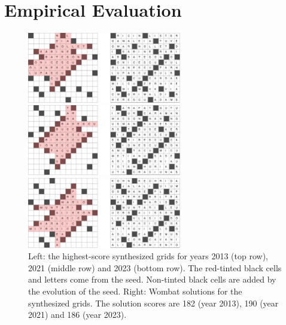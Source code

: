 \section{Empirical Evaluation}


\begin{figure}[h]
\centering
\includegraphics[width=0.6\textwidth]{_empiricalSupport/y-2013/results/_runWombat/mrmeGrids_y2013-60x932-14400x352-14113466-paper.pdf}

\vspace{0.25cm}

\includegraphics[width=0.6\textwidth]{_empiricalSupport/y-2021/results/_runWombat/mrmeGrids_feb3-60x38035-14400x224-13741779-paper.pdf}

\vspace{0.25cm}

\includegraphics[width=0.6\textwidth]{_empiricalSupport/y-2023/results/_runWombat/mrmeGrids_y2023-60x446-14400x352-14179462-paper.pdf}

\caption{Left: the highest-score synthesized grids for years 2013 (top row), 2021 (middle row) and 2023 (bottom row). The red-tinted black cells and letters come from the seed. Non-tinted black cells are added by the evolution of the seed. Right: {\sc Wombat} solutions for the synthesized grids. The solution scores are 182 (year 2013), 190 (year 2021) and 186 (year 2023).}
\label{fig:results}
\end{figure}

